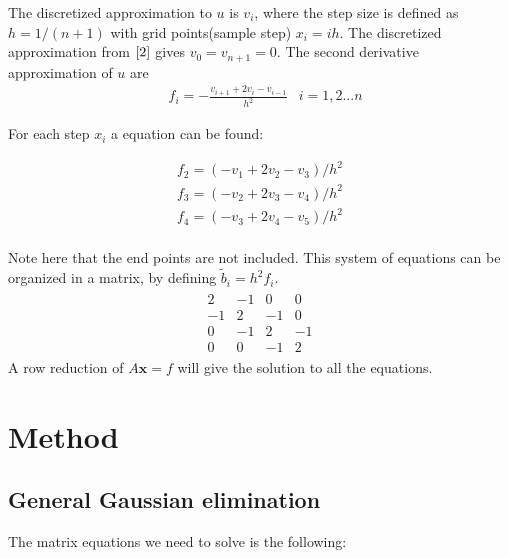 \documentclass[12pt,norsk,a4paper]{article}
\begin{document}
The discretized approximation to $u$ is $v_i$, where the step size is defined as $h=1/(n+1)$ with grid points(sample step) $x_i=ih$. The discretized approximation from $\ref{2}$ gives $v_0=v_{n+1}=0$. The second derivative approximation of $u$ are
\begin{align*}
	&f_i=-\frac{v_{i+1}+2v_{i}-{v_{i-1}}}{h^2}&i=1,2...n
\end{align*} 

For each step $x_i$ a equation can be found:

\begin{align*}
	f_2=(-v_{1}+2v_{2}-v_{3})/h^2\\
	f_3=(-v_{2}+2v_{3}-v_{4})/h^2\\
	f_4=(-v_{3}+2v_{4}-v_{5})/h^2\\
\end{align*}

Note here that the end points are not included. This system of equations can be organized in a matrix, by defining $\tilde{b}_i=h^2f_i$.
\begin{align*}
	\begin{array}{cccc}
	2 & -1 & 0 & 0 \\ 
	-1 & 2 & -1 & 0 \\ 
	0 & -1 & 2 & -1 \\ 
	0 & 0 & -1 & 2
	\end{array}
\end{align*}
 A row reduction of $A\mathbf{x}=f$ will give the solution to all the equations.


\section{Method}

\subsection*{General Gaussian elimination}

The matrix equations we need to solve is the following:
\end{document}
